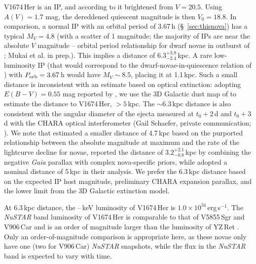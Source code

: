 \documentclass[a4paper,fleqn,usenatbib]{mnras}
\newcommand{\nova}{V1674\,Her}
\newcommand{\nustarlum}{$1.0 \times 10^{34}$\,erg\,s$^{-1}$}
\begin{document}
\nova{} is an IP, and according to \cite{2022ApJ...940L..56P} it brightened from $V=20.5$. 
Using $A(V)=1.7$ mag, the dereddened quiescent magnitude is then $V_0 = 18.8$. In comparison, 
a normal IP with an orbital period of 3.67\,h (\S~\ref{sec:thisnova}) has a typical 
$M_V = 4.8$ (with a scatter of 1 magnitude; the majority of IPs are near the absolute 
$V$ magnitude -- orbital period relationship for dwarf novae in outburst of
\citealt{1987MNRAS.227...23W}; Mukai et al. in prep.). This implies a distance of $6.3^{+3.8}_{-2.4}$\,kpc. %
A rare low-luminosity IP (that would correspond to the dwarf-novae-in-quiescence relation of \citealt{1987MNRAS.227...23W}) with $P_{\rm orb}=3.67$\,h
would have $M_V \sim 8.5$, placing it at 1.1\,kpc. 
%
%
Such a small distance is inconsistent with an estimate based on optical
extinction: adopting $E(B-V)=0.55$ mag reported by \cite{2021ATel14704....1M}, we use 
the 3D Galactic dust map of \cite{2016ApJ...818..130B} to estimate the
distance to \nova{}, $> 5$\,kpc.
The $\sim 6.3$\,kpc distance is also consistent with the angular diameter of
the ejecta measured at $t_0+2$\,d and $t_0+3$\,d with the CHARA optical
interferometer (Gail Schaefer, private communication; \citealt{2005ApJ...628..453T,2020SPIE11446E..05S}).
We note that \cite{2021ApJ...922L..10W} estimated a smaller distance of 4.7\,kpc based on the purported relationship between
the absolute magnitude at maximum and the rate of the lightcurve decline for novae, 
\cite{2022MNRAS.517.6150S} reported the distance of $3.2^{+2.1}_{-0.8}$\,kpc
by combining the negative {\em Gaia} parallax with complex nova-specific priors, 
while \cite{2021ApJ...922L..42D} adopted a nominal distance of 5\,kpc in their analysis.
We prefer the 6.3\,kpc distance based on the expected IP host
magnitude, preliminary CHARA expansion parallax, and  
the lower limit from the 3D Galactic extinction model.

At 6.3\,kpc distance, the \nustarenergylow{}--\nustarenergyhigh{}\,keV
luminosity of \nova{} is \nustarlum{}. 
The {\em NuSTAR} band luminosity of \nova{} is comparable to that of V5855\,Sgr \citep{2019ApJ...872...86N} and V906\,Car \citep{2020MNRAS.497.2569S} 
and is an order of magnitude larger than the luminosity of YZ\,Ret \citep{2022MNRAS.514.2239S}.
Only an order-of-magnitude comparison is appropriate here, as these
novae only have one (two for V906\,Car) {\em NuSTAR} snapshots, 
while the flux in the {\em NuSTAR} band is expected to vary with time.
\end{document}
